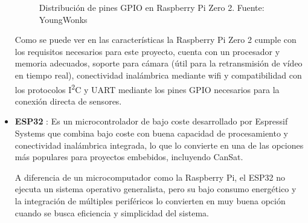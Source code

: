 \begin{itemize}
\begin{figure}[h]
        \caption{Distribución de pines GPIO en Raspberry Pi Zero 2. Fuente: YoungWonks \cite{youngwonks_pizero2_gpio}}
        \label{fig:pizer2_gpio}
    \end{figure}
    Como se puede ver en las características la Raspberry Pi Zero 2 cumple con los requisitos necesarios para este proyecto,
    cuenta con un procesador y memoria adecuados, soporte para cámara (útil para la retransmisión de vídeo en tiempo real), conectividad inalámbrica mediante wifi
    y compatibilidad con los protocolos I\textsuperscript{2}C y UART mediante los pines GPIO necesarios para la conexión directa de sensores.

    \item \textbf{ESP32} \cite{esp32}:
    Es un microcontrolador de bajo coste desarrollado por Espressif Systems que combina bajo coste con buena capacidad de procesamiento y conectividad inalámbrica integrada,
    lo que lo convierte en una de las opciones más populares para proyectos embebidos, incluyendo CanSat.

    A diferencia de un microcomputador como la Raspberry Pi, el ESP32 no ejecuta un sistema operativo generalista,
    pero su bajo consumo energético y la integración de múltiples periféricos lo convierten en muy buena opción cuando se busca eficiencia y simplicidad del sistema.


\end{itemize}
